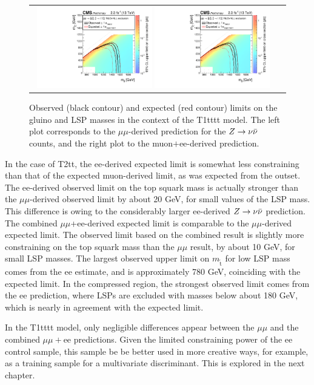 \begin{figure}[htbp]
  \begin{center}
  \begin{tabular}{cc}
\hspace{-1.5cm}
  \includegraphics[angle=0,width=0.48\textwidth]{figures/SusySearches/HadStop2015/HadStopT1tttt_Mu.pdf}
  \includegraphics[angle=0,width=0.48\textwidth]{figures/SusySearches/HadStop2015/HadStopT1tttt_MuEl.pdf}
  \end{tabular}
  \caption{Observed (black contour) and expected (red contour) limits on the gluino and LSP masses in the context of the T1tttt model. The left plot corresponds to the $\mu\mu$-derived prediction for the $Z\rightarrow \nu\bar{\nu}$ counts, and the right plot to the muon$+$ee-derived prediction.}
    \label{fig:fulllimit_T1tttt}
  \end{center}
\end{figure}
In the case of T2tt, the ee-derived expected limit is somewhat less constraining than that of the expected muon-derived limit, as was expected from the outset. The ee-derived observed limit on the top squark mass is actually stronger than the $\mu\mu$-derived observed limit by about 20 GeV, for small values of the LSP mass. This difference is owing to the considerably larger ee-derived $Z\rightarrow \nu\bar{\nu}$ prediction. The combined $\mu\mu$+ee-derived expected limit is comparable to the $\mu\mu$-derived expected limit. The observed limit based on the combined result is slightly more constraining on the top squark mass than the $\mu\mu$ result, by about 10 GeV, for small LSP masses. The largest observed upper limit on $m_{\tilde{\text{t}}}$ for low LSP mass comes from the ee estimate, and is approximately 780 GeV, coinciding with the expected limit. In the compressed region, the strongest observed limit comes from the ee prediction, where LSPs are excluded with masses below about 180 GeV, which is nearly in agreement with the expected limit.

In the T1tttt model, only negligible differences appear between the $\mu\mu$ and the combined $\mu\mu+$ee predictions. Given the limited constraining power of the ee control sample, this sample be be better used in more creative ways, for example, as a training sample for a multivariate discriminant. This is explored in the next chapter.

